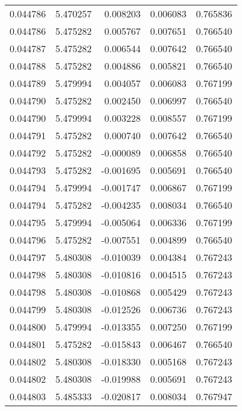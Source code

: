 \begin{tabular}{lrrrr}
0.044786    &  5.470257 &  0.008203 &  0.006083 &             0.765836 \\
0.044786    &  5.475282 &  0.005767 &  0.007651 &             0.766540 \\
0.044787    &  5.475282 &  0.006544 &  0.007642 &             0.766540 \\
0.044788    &  5.475282 &  0.004886 &  0.005821 &             0.766540 \\
0.044789    &  5.479994 &  0.004057 &  0.006083 &             0.767199 \\
0.044790    &  5.475282 &  0.002450 &  0.006997 &             0.766540 \\
0.044790    &  5.479994 &  0.003228 &  0.008557 &             0.767199 \\
0.044791    &  5.475282 &  0.000740 &  0.007642 &             0.766540 \\
0.044792    &  5.475282 & -0.000089 &  0.006858 &             0.766540 \\
0.044793    &  5.475282 & -0.001695 &  0.005691 &             0.766540 \\
0.044794    &  5.479994 & -0.001747 &  0.006867 &             0.767199 \\
0.044794    &  5.475282 & -0.004235 &  0.008034 &             0.766540 \\
0.044795    &  5.479994 & -0.005064 &  0.006336 &             0.767199 \\
0.044796    &  5.475282 & -0.007551 &  0.004899 &             0.766540 \\
0.044797    &  5.480308 & -0.010039 &  0.004384 &             0.767243 \\
0.044798    &  5.480308 & -0.010816 &  0.004515 &             0.767243 \\
0.044798    &  5.480308 & -0.010868 &  0.005429 &             0.767243 \\
0.044799    &  5.480308 & -0.012526 &  0.006736 &             0.767243 \\
0.044800    &  5.479994 & -0.013355 &  0.007250 &             0.767199 \\
0.044801    &  5.475282 & -0.015843 &  0.006467 &             0.766540 \\
0.044802    &  5.480308 & -0.018330 &  0.005168 &             0.767243 \\
0.044802    &  5.480308 & -0.019988 &  0.005691 &             0.767243 \\
0.044803    &  5.485333 & -0.020817 &  0.008034 &             0.767947 \\

\end{tabular}
